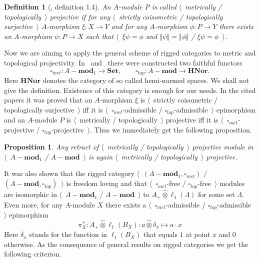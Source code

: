 \documentclass[12pt]{article}
\newcommand{\projtens}{\mathbin{\widehat{\otimes}}}
\newtheorem{proposition}[theorem]{Proposition}
\newtheorem{definition}[theorem]{Definition}
\begin{document}
\begin{definition}[\cite{HelMetrFrQMod}, definition 1.4]\label{MetTopProjMod} An
    $A$-module $P$ is called $\langle$~metrically / topologically~$\rangle$
    projective if for any $\langle$~strictly coisometric / topologically
    surjective~$\rangle$ $A$-morphism $\xi:X\to Y$ and for any $A$-morphism
    $\phi:P\to Y$ there exists an $A$-morphism $\psi:P\to X$ such that
    $\langle$~$\xi\psi=\phi$ and $\Vert\psi\Vert=\Vert\phi\Vert$ /
    $\xi\psi=\phi$~$\rangle$.
\end{definition}

Now we are aiming to apply the general scheme of rigged categories to metric and
topological projectivity. In~\cite{HelMetrFrQMod}
and~\cite{ShtTopFrClassicQuantMod} there were constructed two faithful functors
$$
    \square_{met}:A-\mathbf{mod}_1\to\mathbf{Set},
    \qquad
    \square_{top}:A-\mathbf{mod}\to\mathbf{HNor}.
$$
Here $\mathbf{HNor}$ denotes the category of so called hemi-normed spaces. We
shall not give the definition. Existence of this category is enough for our
needs. In the cited papers it was proved that an $A$-morphism $\xi$ is
$\langle$~strictly coisometric / topologically surjective~$\rangle$ iff it is
$\langle$~$\square_{met}$-admissible / $\square_{top}$-admissible~$\rangle$
epimorphism and an $A$-module $P$ is $\langle$~metrically /
topologically~$\rangle$ projective iff it is
$\langle$~$\square_{met}$-projective / $\square_{top}$-projective~$\rangle$.
Thus we immediately get the following proposition.

\begin{proposition}\label{RetrMetTopProjIsMetTopProj} Any retract of
    $\langle$~metrically / topologically~$\rangle$ projective module in
    $\langle$~$A-\mathbf{mod}_1$ / $A-\mathbf{mod}$~$\rangle$ 
    is again $\langle$~metrically / topologically~$\rangle$ projective.
\end{proposition}

It was also shown that the rigged category 
$\langle$~$(A-\mathbf{mod}_1,\square_{met})$ / 
$(A-\mathbf{mod},\square_{top})$~$\rangle$ is freedom loving and that
$\langle$~$\square_{met}$-free / $\square_{top}$-free~$\rangle$ modules are
isomorphic in $\langle$~$A-\mathbf{mod}_1$ / $A-\mathbf{mod}$~$\rangle$ to
$A_+\projtens\ell_1(\Lambda)$ for some set $\Lambda$.
Even more, for any $A$-module $X$ there exists a
$\langle$~$\square_{met}$-admissible / $\square_{top}$-admissible~$\rangle$
epimorphism
$$
    \pi_X^+:A_+\projtens \ell_1(B_X):a\projtens \delta_x\mapsto a\cdot x
$$
Here $\delta_x$ stands for the function in $\ell_1(B_X)$ that equals $1$ at
point $x$ and $0$ otherwise. As the consequence of general results on rigged
categories we get the following criterion.
\end{document}
